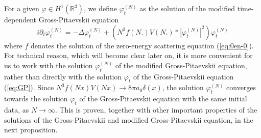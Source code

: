 \documentclass[11pt,a4paper]{article}
\newcommand{\bR}{{\mathbb R}}
\begin{document}
For a given $\varphi \in H^1 (\bR^3)$, we define $\varphi^{(N)}_t$ as the solution of the modified time-dependent Gross-Pitaevskii equation
\begin{equation}\label{eq:mod-GP} i\partial_t \varphi_t^{(N)} = - \Delta \varphi_t^{(N)} + \left( N^3 f(N.) V(N.) * |\varphi^{(N)}_t|^2 \right) \varphi_t^{(N)} \end{equation}
where $f$ denotes the solution of the zero-energy scattering equation (\ref{eq:0en-0}). 
For technical reason, which will become clear later on, it is more convenient for us to work with the solution $\varphi^{(N)}_t$ of the modified Gross-Pitaevskii equation, rather than directly with the solution $\varphi_t$ of the Gross-Pitaevskii equation (\ref{eq:GP}). Since $N^3 f(Nx) V(Nx) \to 8 \pi a_0 \delta (x)$, the solution $\varphi_t^{(N)}$ converges towards the solution $\varphi_t$ of the Gross-Pitaevskii equation with the same initial data, as $N \to \infty$. This is proven, together with other important properties of the solutions of the Gross-Pitaevskii and modified Gross-Pitaevskii equation, in the next proposition. 
\end{document}
